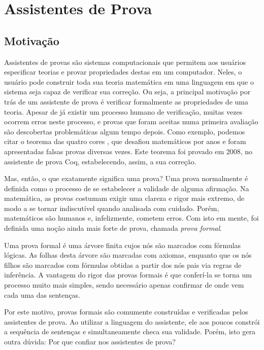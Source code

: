 \section{Assistentes de Prova} 
\subsection{Motivação}

Assistentes de provas são sistemas computacionais que permitem aos usuários
especificar teorias e provar propriedades destas em um computador. Neles, o
usuário pode construir toda sua teoria matemática em uma linguagem em que o
sistema seja capaz de verificar sua correção. Ou seja, a principal motivação por
trás de um assistente de prova é verificar formalmente as propriedades de uma
teoria. Apesar de já existir um processo humano de verificação, muitas vezes
ocorrem erros neste processo, e provas que foram aceitas numa primeira avaliação
são descobertas problemáticas algum tempo depois. Como exemplo, podemos citar o
teorema das quatro cores \cite{four_colour}, que desafiou matemáticos por anos e
foram apresentadas falsas provas diversas vezes. Este teorema foi provado em
2008, no assistente de prova  Coq, estabelecendo, assim, a sua correção.
\cite{4colproof, gonthieril:_four_colour_theor}

Mas, então, o que exatamente significa uma prova? Uma prova normalmente é
definida como o processo de se estabelecer a validade de alguma afirmação. Na
matemática, as provas costumam exigir uma clareza e rigor mais extremo, de modo
a se tornar indiscutível quando analisada com cuidado. Porém, matemáticos são
humanos e, infelizmente, cometem erros. Com isto em mente, foi definida uma
noção ainda mais forte de prova, chamada \emph{prova formal}.

Uma prova formal é uma árvore finita cujos nós são marcados com fórmulas
lógicas. As folhas desta árvore são marcadas com axiomas, enquanto que os nós
filhos são marcados com fórmulas obtidas a partir dos nós pais via regras de
inferência. A vantagem do rigor das provas formais é que conferí-la se torna um
processo muito mais simples, sendo necessário apenas confirmar de onde vem cada
uma das sentenças.

Por este motivo, provas formais são comumente construídas e verificadas pelos
assistentes de prova. Ao utilizar a linguagem do assistente, ele aos poucos
constrói a sequência de sentenças e simultaneamente checa sua validade. Porém,
isto gera outra dúvida: Por que confiar nos assistentes de prova?


